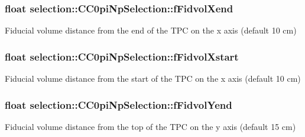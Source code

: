 \subsubsection[{\texorpdfstring{f\+Fidvol\+Xend}{fFidvolXend}}]{\setlength{\rightskip}{0pt plus 5cm}float selection\+::\+C\+C0pi\+Np\+Selection\+::f\+Fidvol\+Xend\hspace{0.3cm}{\ttfamily [private]}}\hypertarget{classselection_1_1CC0piNpSelection_a754589459e1f2d90a8ad853c68f864db}{}\label{classselection_1_1CC0piNpSelection_a754589459e1f2d90a8ad853c68f864db}
Fiducial volume distance from the end of the T\+PC on the x axis (default 10 cm) 
\subsubsection[{\texorpdfstring{f\+Fidvol\+Xstart}{fFidvolXstart}}]{\setlength{\rightskip}{0pt plus 5cm}float selection\+::\+C\+C0pi\+Np\+Selection\+::f\+Fidvol\+Xstart\hspace{0.3cm}{\ttfamily [private]}}\hypertarget{classselection_1_1CC0piNpSelection_a783e7f9dcd42c083658870f7d23931da}{}\label{classselection_1_1CC0piNpSelection_a783e7f9dcd42c083658870f7d23931da}
Fiducial volume distance from the start of the T\+PC on the x axis (default 10 cm) 
\subsubsection[{\texorpdfstring{f\+Fidvol\+Yend}{fFidvolYend}}]{\setlength{\rightskip}{0pt plus 5cm}float selection\+::\+C\+C0pi\+Np\+Selection\+::f\+Fidvol\+Yend\hspace{0.3cm}{\ttfamily [private]}}\hypertarget{classselection_1_1CC0piNpSelection_a4732dc1091cb1881c741d57f999b5035}{}\label{classselection_1_1CC0piNpSelection_a4732dc1091cb1881c741d57f999b5035}
Fiducial volume distance from the top of the T\+PC on the y axis (default 15 cm) 
